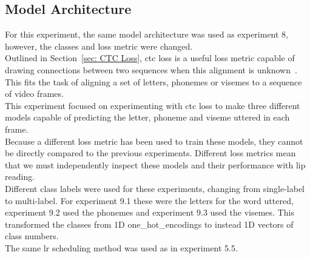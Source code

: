 \subsection{Model Architecture}
For this experiment, the same model architecture was used as experiment 8, however, the classes and loss metric were changed.\\
Outlined in Section~\ref{sec: CTC Loss}, \acrshort{ctc} loss is a useful loss metric capable of drawing connections between two sequences when this alignment is unknown~\cite{exploration-of-CTC-acoustic-models}. This fits the task of aligning a set of letters, \gls{phoneme}s or \gls{viseme}s to a sequence of video frames.\\
This experiment focused on experimenting with \acrshort{ctc} loss to make three different models capable of predicting the letter, \gls{phoneme} and \gls{viseme} uttered in each frame.\\
Because a different loss metric has been used to train these models, they cannot be directly compared to the previous experiments. Different loss metrics mean that we must independently inspect these models and their performance with lip reading.\\
Different class labels were used for these experiments, changing from \gls{single-label} to \gls{multi-label}. For experiment 9.1 these were the letters for the word uttered, experiment 9.2 used the \gls{phoneme}s and experiment 9.3 used the \gls{viseme}s. This transformed the classes from 1D \gls{one_hot_encoding}s to instead 1D vectors of class numbers.\\
The same \acrshort{lr} scheduling method was used as in experiment 5.5.
